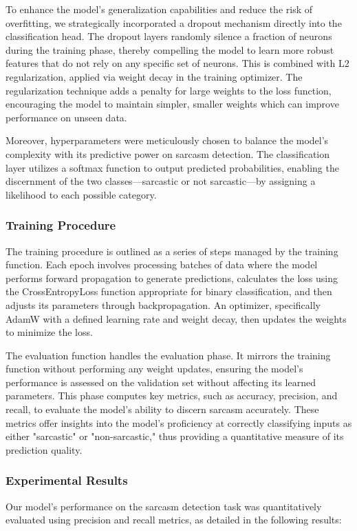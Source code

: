 \documentclass[10pt,twocolumn,letterpaper]{article}
\begin{document}
To enhance the model's generalization capabilities and reduce the risk of overfitting, we strategically incorporated a dropout mechanism directly into the classification head. The dropout layers randomly silence a fraction of neurons during the training phase, thereby compelling the model to learn more robust features that do not rely on any specific set of neurons. This is combined with L2 regularization, applied via weight decay in the training optimizer. The regularization technique adds a penalty for large weights to the loss function, encouraging the model to maintain simpler, smaller weights which can improve performance on unseen data.

Moreover, hyperparameters were meticulously chosen to balance the model's complexity with its predictive power on sarcasm detection. The classification layer utilizes a softmax function to output predicted probabilities, enabling the discernment of the two classes—sarcastic or not sarcastic—by assigning a likelihood to each possible category.

\subsubsection{Training Procedure}
The training procedure is outlined as a series of steps managed by the training function. Each epoch involves processing batches of data where the model performs forward propagation to generate predictions, calculates the loss using the CrossEntropyLoss function appropriate for binary classification, and then adjusts its parameters through backpropagation. An optimizer, specifically AdamW with a defined learning rate and weight decay, then updates the weights to minimize the loss.

The evaluation function handles the evaluation phase. It mirrors the training function without performing any weight updates, ensuring the model's performance is assessed on the validation set without affecting its learned parameters. This phase computes key metrics, such as accuracy, precision, and recall, to evaluate the model's ability to discern sarcasm accurately. These metrics offer insights into the model's proficiency at correctly classifying inputs as either "sarcastic" or "non-sarcastic," thus providing a quantitative measure of its prediction quality.

\subsubsection{Experimental Results}
Our model's performance on the sarcasm detection task was quantitatively evaluated using precision and recall metrics, as detailed in the following results:
\end{document}
